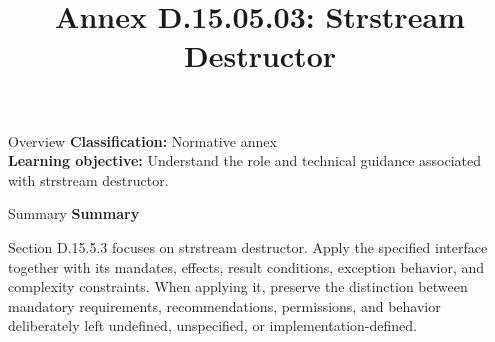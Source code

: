 \documentclass[10pt,letterpaper]{article}
\title{Annex D.15.05.03: Strstream Destructor}
\author{}
\date{}
\begin{document}
\maketitle
\begin{CornellOverviewBox}{Overview}
\textbf{Classification:} Normative annex\\[2pt]
\textbf{Learning objective:} Understand the role and technical guidance associated with strstream destructor.
\end{CornellOverviewBox}\begin{CornellSummaryBox}{Summary}
{\sffamily\bfseries\color{Accent} Summary}\par\vspace{3pt}Section D.15.5.3 focuses on strstream destructor. Apply the specified interface together with its mandates, effects, result conditions, exception behavior, and complexity constraints. When applying it, preserve the distinction between mandatory requirements, recommendations, permissions, and behavior deliberately left undefined, unspecified, or implementation-defined.
\end{CornellSummaryBox}
\end{document}
